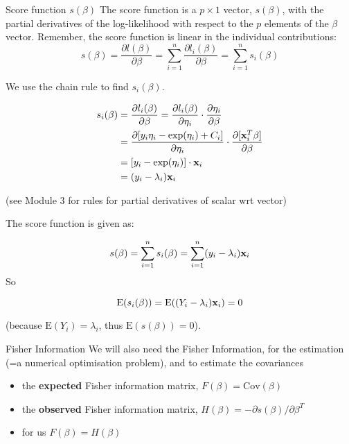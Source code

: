 \documentclass[
  ignorenonframetext,
]{beamer}
\providecommand{\tightlist}{%
  \setlength{\itemsep}{0pt}\setlength{\parskip}{0pt}}
\begin{document}
\begin{frame}
\begin{block}{Score function \(s(\beta)\)}
\label{score-function-sbeta}
The score function is a \(p\times 1\) vector, \(s(\beta)\), with the
partial derivatives of the log-likelihood with respect to the \(p\)
elements of the \(\beta\) vector. Remember, the score function is linear
in the individual contributions:
\[s(\beta)=\frac{\partial l(\beta)}{\partial \beta}=
\sum_{i=1}^n \frac{\partial l_i(\beta)}{\partial \beta}=
\sum_{i=1}^n s_i(\beta)\]

We use the chain rule to find \(s_i(\beta)\).

\[
\begin{aligned}
s_i(\beta)&=\frac{\partial l_i(\beta)}{\partial \beta}=\frac{\partial l_i(\beta)}{\partial \eta_i}\cdot \frac{\partial \eta_i}{\partial \beta} \\
&=\frac{\partial [y_i\eta_i-\exp(\eta_i)+C_i]}{\partial \eta_i}\cdot \frac{\partial [{\bf x}_i^T\beta ]}{\partial \beta}\\
&=[y_i-\exp(\eta_i)]\cdot {\bf x}_i \\
&=(y_i-\lambda_i){\bf x}_i
\end{aligned}
\]

(see Module 3 for rules for partial derivatives of scalar wrt vector)
\end{block}
\end{frame}

\begin{frame}
The score function is given as:

\[s(\beta)=\sum_{i=1}^n s_i(\beta)=\sum_{i=1}^n (y_i-\lambda_i){\bf x}_i\]
So

\[
\text{E}(s_i(\beta))=\text{E}((Y_i-\lambda_i){\bf x}_i)=0
\]

(because \(\text{E}(Y_i)=\lambda_i\), thus \(\text{E}(s(\beta))=0\)).
\end{frame}

\begin{frame}
\begin{block}{Fisher Information}
\label{fisher-information}
We will also need the Fisher Information, for the estimation (=a
numerical optimisation problem), and to estimate the covariances

\begin{itemize}
\tightlist
\item
  the \textbf{expected} Fisher information matrix,
  \(F(\beta) = \text{Cov}(\beta)\)
\item
  the \textbf{observed} Fisher information matrix,
  \(H(\beta) = -{\partial s(\beta)}/{\partial\beta^T}\)
\item
  for us \(F(\beta) = H(\beta)\)
\end{itemize}
\end{block}
\end{frame}
\end{document}

